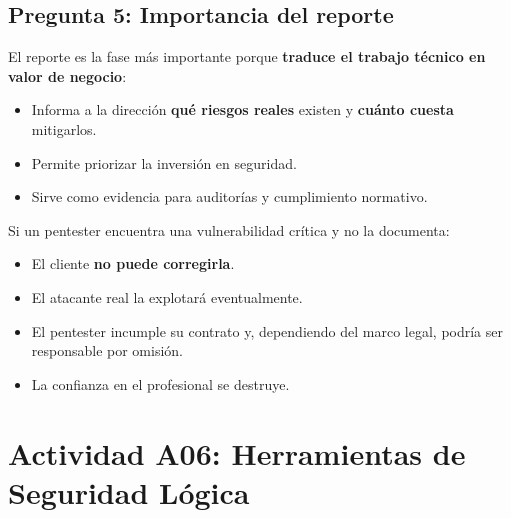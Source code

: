 \documentclass[11pt,a4paper]{article}
\begin{document}
\subsection*{Pregunta 5: Importancia del reporte}
\begin{respuesta}
El reporte es la fase más importante porque \textbf{traduce el trabajo técnico en valor de negocio}:
\begin{itemize}[leftmargin=*]
  \item Informa a la dirección \textbf{qué riesgos reales} existen y \textbf{cuánto cuesta} mitigarlos.
  \item Permite priorizar la inversión en seguridad.
  \item Sirve como evidencia para auditorías y cumplimiento normativo.
\end{itemize}
Si un pentester encuentra una vulnerabilidad crítica y no la documenta:
\begin{itemize}[leftmargin=*]
  \item El cliente \textbf{no puede corregirla}.
  \item El atacante real la explotará eventualmente.
  \item El pentester incumple su contrato y, dependiendo del marco legal, podría ser responsable por omisión.
  \item La confianza en el profesional se destruye.
\end{itemize}
\end{respuesta}

\section{Actividad A06: Herramientas de Seguridad Lógica}
\end{document}
